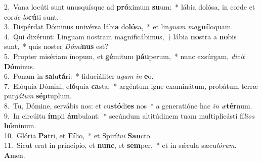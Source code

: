 {2.~}Vana locúti sunt unusquísque ad \textbf{pró}ximum \textbf{su}um:~* lábia dolósa, in corde et cor\textit{de} \textit{lo}\textbf{cú}ti sunt.\\
{3.~}Dispérdat Dóminus univérsa lábi\textbf{a} do\textbf{ló}sa,~* et lin\textit{guam} \textit{ma}\textbf{gní}loquam.\\
{4.~}Qui dixérunt: Linguam nostram magnificábimus,~† lábia \textbf{no}stra a \textbf{no}bis sunt,~* quis noster \textit{Dó}\textit{mi}\textbf{nus} est?\\
{5.~}Propter misériam ínopum, et \textbf{gé}mitum \textbf{páu}perum,~* nunc exsúrgam, \textit{di}\textit{cit} \textbf{Dó}minus.\\
{6.~}Ponam in \textbf{sa}lu\textbf{tá}ri:~* fiduciáliter a\textit{gam} \textit{in} \textbf{e}o.\\
{7.~}Elóquia Dómini, e\textbf{ló}quia \textbf{ca}sta:~* argéntum igne examinátum, probátum terræ pur\textit{gá}\textit{tum} \textbf{sép}tuplum.\\
{8.~}Tu, Dómine, servábis nos: et cu\textbf{stó}di\textbf{es} nos~* a generatióne hac \textit{in} \textit{æ}\textbf{tér}num.\\
{9.~}In circúitu \textbf{ím}pii \textbf{ám}bulant:~* secúndum altitúdinem tuam multiplicásti fí\textit{li}\textit{os} \textbf{hó}minum.\\
{10.~}Glória \textbf{Pa}tri, et \textbf{Fí}lio,~* et Spirí\textit{tu}\textit{i} \textbf{San}cto.\\
{11.~}Sicut erat in princípio, et \textbf{nunc}, et \textbf{sem}per,~* et in sǽcula sæcu\textit{ló}\textit{rum}. \textbf{A}men.\\
